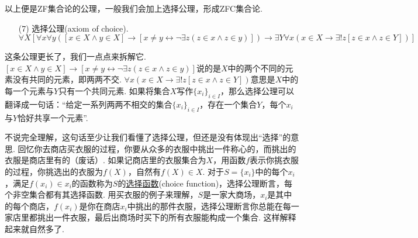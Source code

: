 \documentclass[main.tex]{subfiles}
\begin{document}
\vspace{1cm}

以上便是\textsf{ZF}集合论的公理，一般我们会加上选择公理，形成\textsf{ZFC}集合论.

\begin{itemize}
    \item  [(7)] 选择公理(axiom of choice).
    \[\forall X [\forall x \forall y([x \in X \wedge y \in X] \rightarrow [x \neq y \leftrightarrow \neg \exists z(z \in x \wedge z \in y)]) \rightarrow \exists Y \forall x(x \in X \rightarrow \exists! z[z \in x \wedge z \in Y])]\]
\end{itemize}

\begin{note}
    这条公理更长了，我们一点点来拆解它. \([x \in X \wedge y \in X] \rightarrow [x \neq y \leftrightarrow \neg \exists z(z \in x \wedge z \in y)]\)说的是\(X\)中的两个不同的元素没有共同的元素，即两两不交. \(\forall x(x \in X \rightarrow \exists! z[z \in x \wedge z \in Y])\)意思是\(X\)中的每一个元素与\(Y\)只有一个共同元素. 如果将集合\(X\)写作\(\{x_i\}_{i \in I}\)，那么选择公理可以翻译成一句话：“给定一系列两两不相交的集合\(\{x_i\}_{i \in I}\)，存在一个集合\(Y\)，每个\(x_i\)与\(Y\)恰好共享一个元素”.

    不说完全理解，这句话至少让我们看懂了选择公理，但还是没有体现出“选择”的意思. 回忆你去商店买衣服的过程，你要从众多的衣服中挑出一件称心的，而挑出的衣服是商店里有的（废话）. 如果记商店里的衣服集合为\(X\)，用函数\(f\)表示你挑衣服的过程，你挑选出的衣服为\(f(X)\)，自然有\(f(X) \in X\). 对于\(S=\{x_i\}\)中的每个\(x_i\)，满足\(f(x_i) \in x_i\)的函数称为\(S\)的\uline{选择函数}(choice function)，选择公理断言，每个非空集合都有其选择函数. 用买衣服的例子来理解，\(S\)是一家大商场，\(x_i\)是其中的每个商店，\(f(x_i)\)是你在商店\(x_i\)中挑出的那件衣服，选择公理断言你总能在每一家店里都挑出一件衣服，最后出商场时买下的所有衣服能构成一个集合. 这样解释起来就自然多了.
\end{note}

\vspace{1cm}
\end{document}
